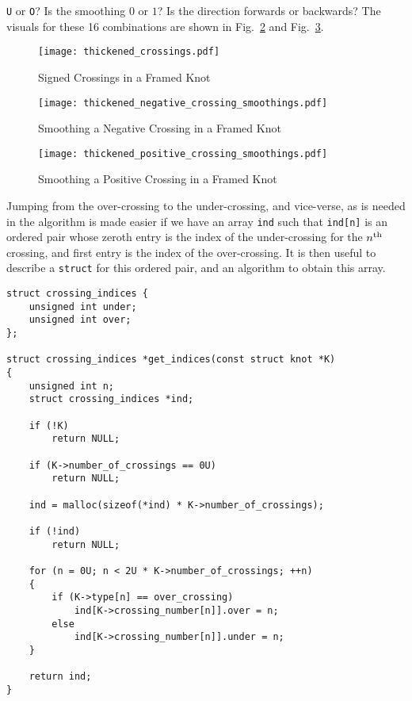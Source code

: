         \texttt{U} or \texttt{O}? Is the smoothing $0$ or $1$?
        Is the direction forwards or backwards? The
        visuals for these 16 combinations are shown in
        Fig.~\ref{fig:thickened_negative_crossing_smoothings} and
        Fig.~\ref{fig:thickened_positive_crossing_smoothings}.
        \par\hfill\par
        \begin{figure}
            \centering
            \texttt{[image: thickened\_crossings.pdf]}
            \caption{Signed Crossings in a Framed Knot}
            \label{fig:thickened_crossings}
        \end{figure}
        \begin{figure}
            \centering
            \texttt{[image: thickened\_negative\_crossing\_smoothings.pdf]}
            \caption{Smoothing a Negative Crossing in a Framed Knot}
            \label{fig:thickened_negative_crossing_smoothings}
        \end{figure}
        \begin{figure}
            \centering
            \texttt{[image: thickened\_positive\_crossing\_smoothings.pdf]}
            \caption{Smoothing a Positive Crossing in a Framed Knot}
            \label{fig:thickened_positive_crossing_smoothings}
        \end{figure}
        Jumping from the over-crossing to the under-crossing, and vice-verse,
        as is needed in the algorithm is made easier if we have an array
        \texttt{ind} such that \texttt{ind[n]} is an ordered pair whose
        zeroth entry is the index of the under-crossing for the
        $n^{\small\textrm{th}}$ crossing, and first entry is the index of the
        over-crossing. It is then
        useful to describe a \texttt{struct} for this ordered pair, and an
        algorithm to obtain this array.
\begin{lstlisting}[style=CStyle]
struct crossing_indices {
    unsigned int under;
    unsigned int over;
};

struct crossing_indices *get_indices(const struct knot *K)
{
    unsigned int n;
    struct crossing_indices *ind;

    if (!K)
        return NULL;

    if (K->number_of_crossings == 0U)
        return NULL;

    ind = malloc(sizeof(*ind) * K->number_of_crossings);

    if (!ind)
        return NULL;

    for (n = 0U; n < 2U * K->number_of_crossings; ++n)
    {
        if (K->type[n] == over_crossing)
            ind[K->crossing_number[n]].over = n;
        else
            ind[K->crossing_number[n]].under = n;
    }

    return ind;
}
\end{lstlisting}
